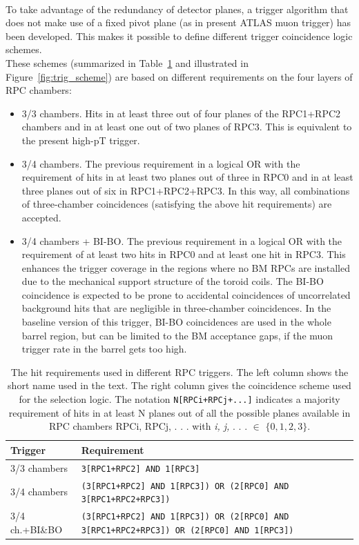 \\To take advantage of the redundancy of detector planes, a trigger algorithm that does not
make use of a fixed pivot plane (as in present ATLAS muon trigger) has been developed.
This makes it possible to define different trigger coincidence logic schemes.\\ 
These schemes (summarized in Table~\ref{tab:trig_scheme} and illustrated in Figure~\ref{fig:trig_scheme}) are based on different requirements on the  four layers of RPC chambers:
\begin{itemize}
	\item 3/3 chambers. Hits in at least three out of four planes of the RPC1+RPC2 chambers
and in at least one out of two planes of RPC3. This is equivalent to the present high-pT
trigger.
	\item 3/4 chambers. The previous requirement in a logical OR with the requirement of
hits in at least two planes out of three in RPC0 and in at least three planes out of six
in RPC1+RPC2+RPC3. In this way, all combinations of three-chamber coincidences
(satisfying the above hit requirements) are accepted.
	\item 3/4 chambers + BI-BO. The previous requirement in a logical OR with the requirement
of at least two hits in RPC0 and at least one hit in RPC3. This enhances the
trigger coverage in the regions where no BM RPCs are installed due to the mechanical
support structure of the toroid coils. The BI-BO coincidence is expected to be
prone to accidental coincidences of uncorrelated background hits that are negligible
in three-chamber coincidences. In the baseline version of this trigger, BI-BO coincidences
are used in the whole barrel region, but can be limited to the BM acceptance
gaps, if the muon trigger rate in the barrel gets too high.
\end{itemize}
\begin{table}[h]
	\begin{center}
		\begin{tabular}{lp{}}
			\textbf{Trigger}  & \textbf{Requirement} \\
			\hline 
			3/3 chambers     & \scriptsize{\texttt{3[RPC1+RPC2] AND 1[RPC3]}} \\
			3/4 chambers     & \scriptsize{\texttt{(3[RPC1+RPC2] AND 1[RPC3]) OR (2[RPC0] AND 3[RPC1+RPC2+RPC3])}}\\
			3/4 ch.+BI\&BO    & \scriptsize{\texttt{(3[RPC1+RPC2] AND 1[RPC3]) OR (2[RPC0] AND 3[RPC1+RPC2+RPC3]) \hspace{2cm} OR (2[RPC0] AND 1[RPC3])}}\\
			\hline 
		\end{tabular} 
		\caption{The hit requirements used in different RPC triggers. The left column shows the short name used in the text. The right column gives the coincidence scheme used for the selection logic. The notation \texttt{N[RPCi+RPCj+...]} indicates a majority requirement of hits in at least N planes out of all the possible planes available in RPC chambers RPCi, RPCj, . . . with \textit{i, j,} . . . \textit{$\in$} $\{0, 1, 2, 3\}$.} 
		\label{tab:trig_scheme}
	\end{center} 
\end{table} 
